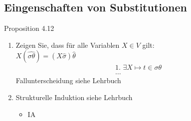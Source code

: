 \subsection{Eingenschaften von Substitutionen}
Proposition 4.12
\begin{enumerate}
	\item Zeigen Sie, dass für alle Variablen \(X \in V\) gilt: \\
	\( X(\widehat{\sigma\theta}) = (X\hat \sigma )\hat \theta \)
	\begin{align*}
		&\text{1. } \exists X\mapsto t\in \sigma\theta \\
		&\ldots
	\end{align*}
	Fallunterscheidung siehe Lehrbuch
	\item Strukturelle Induktion siehe Lehrbuch
	\begin{itemize}
		\item IA
	\end{itemize}
\end{enumerate}